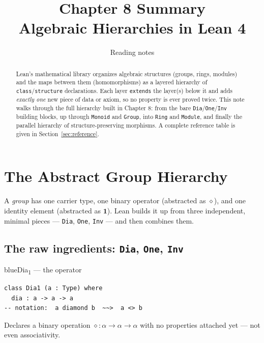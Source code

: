 \documentclass[11pt]{article}
\title{\vspace{-1.5cm}\textbf{Chapter 8 Summary}\\[2pt]\Large Algebraic Hierarchies in Lean 4}
\author{Reading notes}
\date{}
\begin{document}
\maketitle
\vspace{-0.6cm}

\begin{abstract}
\noindent Lean's mathematical library organizes algebraic structures (groups, rings, modules) and the maps between them (homomorphisms) as a layered hierarchy of \texttt{class}/\texttt{structure} declarations. Each layer \texttt{extends} the layer(s) below it and adds \emph{exactly one} new piece of data or axiom, so no property is ever proved twice. This note walks through the full hierarchy built in Chapter 8: from the bare \texttt{Dia}/\texttt{One}/\texttt{Inv} building blocks, up through \texttt{Monoid} and \texttt{Group}, into \texttt{Ring} and \texttt{Module}, and finally the parallel hierarchy of structure-preserving morphisms. A complete reference table is given in Section~\ref{sec:reference}.
\end{abstract}
\vspace{-0.3cm}
\tableofcontents

\section{The Abstract Group Hierarchy}

A \emph{group} has one carrier type, one binary operator (abstracted as $\diamond$), and one identity element (abstracted as $\mathbf{1}$). Lean builds it up from three independent, minimal pieces --- \texttt{Dia}, \texttt{One}, \texttt{Inv} --- and then combines them.

\subsection{The raw ingredients: \texttt{Dia}, \texttt{One}, \texttt{Inv}}

\begin{defbox}{blue}{Dia\textsubscript{1} --- the operator}
\begin{lstlisting}
class Dia1 (a : Type) where
  dia : a -> a -> a
-- notation:  a diamond b  ~~>  a <> b
\end{lstlisting}
Declares a binary operation $\diamond : \alpha \to \alpha \to \alpha$ with no properties attached yet --- not even associativity.
\end{defbox}
\end{document}
